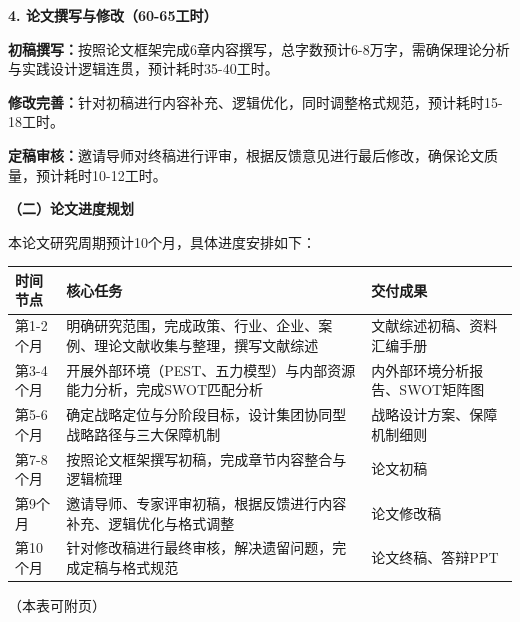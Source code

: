 \documentclass[UTF8, a4paper, 11pt]{ctexart}
\begin{document}
\begin{UnifiedBox}[height=25.4cm]
\vspace{0.2cm}
\noindent \textbf{4. 论文撰写与修改（60-65工时）}

\noindent \textbf{初稿撰写：}按照论文框架完成6章内容撰写，总字数预计6-8万字，需确保理论分析与实践设计逻辑连贯，预计耗时35-40工时。

\noindent \textbf{修改完善：}针对初稿进行内容补充、逻辑优化，同时调整格式规范，预计耗时15-18工时。

\noindent \textbf{定稿审核：}邀请导师对终稿进行评审，根据反馈意见进行最后修改，确保论文质量，预计耗时10-12工时。

\vspace{0.5cm}
\noindent \textbf{（二）论文进度规划}

\vspace{0.2cm}
本论文研究周期预计10个月，具体进度安排如下：

\vspace{0.3cm}
\noindent
\renewcommand{\arraystretch}{1.8}
\begin{tabular}{|>{\centering\arraybackslash}p{2.5cm}|>{\arraybackslash}p{5.5cm}|>{\arraybackslash}p{5.5cm}|}
\hline
\bfseries 时间节点 & \bfseries 核心任务 & \bfseries 交付成果 \\
\hline
第1-2个月 & 明确研究范围，完成政策、行业、企业、案例、理论文献收集与整理，撰写文献综述 & 文献综述初稿、资料汇编手册 \\
\hline
第3-4个月 & 开展外部环境（PEST、五力模型）与内部资源能力分析，完成SWOT匹配分析 & 内外部环境分析报告、SWOT矩阵图 \\
\hline
第5-6个月 & 确定战略定位与分阶段目标，设计集团协同型战略路径与三大保障机制 & 战略设计方案、保障机制细则 \\
\hline
第7-8个月 & 按照论文框架撰写初稿，完成章节内容整合与逻辑梳理 & 论文初稿 \\
\hline
第9个月 & 邀请导师、专家评审初稿，根据反馈进行内容补充、逻辑优化与格式调整 & 论文修改稿 \\
\hline
第10个月 & 针对修改稿进行最终审核，解决遗留问题，完成定稿与格式规范 & 论文终稿、答辩PPT \\
\hline
\end{tabular}

\vspace*{\fill}
\begin{flushright} （本表可附页） \end{flushright}
\end{UnifiedBox}

\newpage
\end{document}
